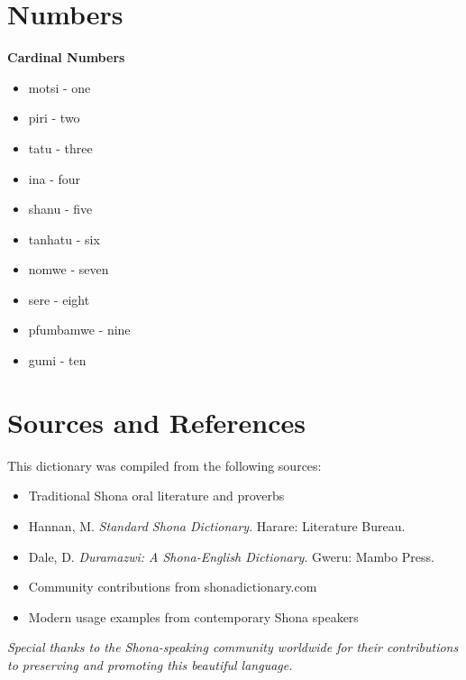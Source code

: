 \documentclass[10pt,twoside]{book}
\begin{document}
\chapter{Numbers}
\begin{multicols}{2}
\RaggedRight

\textbf{Cardinal Numbers}
\begin{itemize}[leftmargin=*]
\item motsi - one
\item piri - two
\item tatu - three
\item ina - four
\item shanu - five
\item tanhatu - six
\item nomwe - seven
\item sere - eight
\item pfumbamwe - nine
\item gumi - ten
\end{itemize}

\end{multicols}

\chapter*{Sources and References}

This dictionary was compiled from the following sources:

\begin{itemize}
\item Traditional Shona oral literature and proverbs
\item Hannan, M. \textit{Standard Shona Dictionary}. Harare: Literature Bureau.
\item Dale, D. \textit{Duramazwi: A Shona-English Dictionary}. Gweru: Mambo Press.
\item Community contributions from shonadictionary.com
\item Modern usage examples from contemporary Shona speakers
\end{itemize}

\vspace{1cm}
\textit{Special thanks to the Shona-speaking community worldwide for their contributions to preserving and promoting this beautiful language.}
\end{document}
